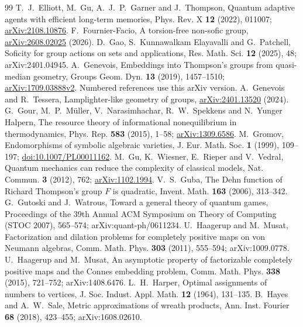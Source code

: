 \begin{thebibliography}{99}
 T.~J.~Elliott, M.~Gu, A.~J.~P.~Garner and J.~Thompson, Quantum adaptive agents with efficient long-term memories, Phys. Rev. X \textbf{12} (2022), 011007; \href{https://arxiv.org/abs/2108.10876}{arXiv:2108.10876}.
 F.~Fournier-Facio, A torsion-free non-sofic group, \href{https://arxiv.org/abs/2608.02025}{arXiv:2608.02025} (2026).
 D.~Gao, S.~Kunnawalkam Elayavalli and G.~Patchell, Soficity for group actions on sets and applications, Res. Math. Sci. \textbf{12} (2025), 48; arXiv:2401.04945.
 A.~Genevois, Embeddings into Thompson's groups from quasi-median geometry, Groups Geom. Dyn. \textbf{13} (2019), 1457--1510; \href{https://arxiv.org/abs/1709.03888v2}{arXiv:1709.03888v2}. Numbered references use this arXiv version.
 A.~Genevois and R.~Tessera, Lamplighter-like geometry of groups, \href{https://arxiv.org/abs/2401.13520}{arXiv:2401.13520} (2024).
 G.~Gour, M.~P.~M\"uller, V.~Narasimhachar, R.~W.~Spekkens and N.~Yunger Halpern, The resource theory of informational nonequilibrium in thermodynamics, Phys. Rep. \textbf{583} (2015), 1--58; \href{https://arxiv.org/abs/1309.6586}{arXiv:1309.6586}.
 M.~Gromov, Endomorphisms of symbolic algebraic varieties, J. Eur. Math. Soc. \textbf{1} (1999), 109--197; \href{https://doi.org/10.1007/PL00011162}{doi:10.1007/PL00011162}.
 M.~Gu, K.~Wiesner, E.~Rieper and V.~Vedral, Quantum mechanics can reduce the complexity of classical models, Nat. Commun. \textbf{3} (2012), 762; \href{https://arxiv.org/abs/1102.1994}{arXiv:1102.1994}.
 V.~S.~Guba, The Dehn function of Richard Thompson's group $F$ is quadratic, Invent. Math. \textbf{163} (2006), 313--342.
 G.~Gutoski and J.~Watrous, Toward a general theory of quantum games, Proceedings of the 39th Annual ACM Symposium on Theory of Computing (STOC 2007), 565--574; arXiv:quant-ph/0611234.
 U.~Haagerup and M.~Musat, Factorization and dilation problems for completely positive maps on von Neumann algebras, Comm. Math. Phys. \textbf{303} (2011), 555--594; arXiv:1009.0778.
 U.~Haagerup and M.~Musat, An asymptotic property of factorizable completely positive maps and the Connes embedding problem, Comm. Math. Phys. \textbf{338} (2015), 721--752; arXiv:1408.6476.
 L.~H.~Harper, Optimal assignments of numbers to vertices, J. Soc. Indust. Appl. Math. \textbf{12} (1964), 131--135.
 B.~Hayes and A.~W.~Sale, Metric approximations of wreath products, Ann. Inst. Fourier \textbf{68} (2018), 423--455; arXiv:1608.02610.

\end{thebibliography}
